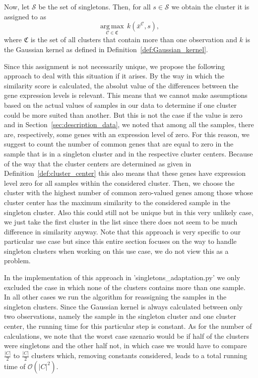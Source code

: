 \documentclass[paper=a4,fontsize=11pt,DIV=8,BCOR=5mm,twoside,pdftex,bibtotocnumbered]{scrreprt}
\DeclareMathOperator*{\argmax}{arg\,max}
\theoremstyle{plain}
\begin{document}
Now, let $\mathcal{S}$ be the set of singletons. Then, for all $s\in \mathcal{S}$ we obtain the cluster it is assigned to as 
\[
	\underset{{\mathcal{C}\in \mathfrak{C}}}{\argmax}  \, k(\bar{x}^{\mathcal C}, s),
\]
where $\mathfrak{C}$ is the set of all clusters that contain more than one observation and $k$ is the Gaussian kernel as defined in Definition~\ref{def:Gaussian_kernel}. 

Since this assignment is not necessarily unique, we propose the following approach to deal with this situation if it arises. By the way in which the similarity score is calculated, the absolut value of the differences between the gene expression levels is relevant. This means that we cannot make assumptions based on the actual values of samples in our data to determine if one cluster could be more suited than another. But this is not the case if the value is zero and in Section~\ref{sec:description_data}, we noted that among all the samples, there are, respectively, some genes with an expression level of zero. For this reason, we suggest to count the number of common genes that are equal to zero in the sample that is in a singleton cluster and in the respective cluster centers. Because of the way that the cluster centers are determined as given in Definition~\ref{def:cluster_center} this also means that these genes have expression level zero for all samples within the considered cluster. Then, we choose the cluster with the highest number of common zero-valued genes among those whose cluster center has the maximum similarity to the considered sample in the singleton cluster. Also this could still not be unique but in this very unlikely case, we just take the first cluster in the list since there does not seem to be much difference in similarity anyway. Note that this approach is very specific to our particular use case but since this entire section focuses on the way to handle singleton clusters when working on this use case, we do not view this as a problem.

In the implementation of this approach in 'singletons\_adaptation.py' we only excluded the case in which none of the clusters contains more than one sample. In all other cases we run the algorithm for reassigning the samples in the singleton clusters. Since the Gaussian kernel is always calculated between only two observations, namely the sample in the singleton cluster and one cluster center, the running time for this particular step is constant. As for the number of calculations, we note that the worst case szenario would be if half of the clusters were singletons and the other half not, in which case we would have to compare $\frac{|C|}{2}$ to $\frac{|C|}{2}$ clusters which, removing constants considered, leads to a total running time of $\mathcal{O}(|C|^2)$.
\end{document}
